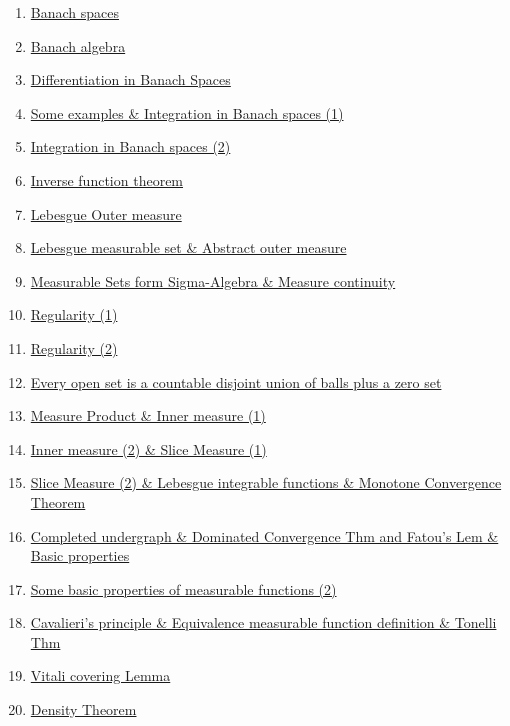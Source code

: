 \documentclass[11pt]{article}
\begin{document}
\begin{enumerate}
	\item	\href{https://mp.weixin.qq.com/s/TkN4d9Hla9-C_1o2VpvLXg}{Banach spaces} 	%
	\item 	\href{https://mp.weixin.qq.com/s/GF_PalPTEH7uFpzTMvFzXw}{Banach algebra}	%
	\item 	\href{https://mp.weixin.qq.com/s/bSUyP1ZBOypLaOCTX3abCA}{Differentiation in Banach Spaces}	%
	\item 	\href{https://mp.weixin.qq.com/s/4mhJzCdRBN11zi2Dy0SvuA}{Some examples \& Integration in Banach spaces (1)}	%
	\item 	\href{https://mp.weixin.qq.com/s/Lhk-fSknKiRoxcfiHYq86w}{Integration in Banach spaces (2)}	%
	\item 	\href{https://mp.weixin.qq.com/s/Z1-miHbarybT2ZR0NitX9A}{Inverse function theorem}	%
	\item 	\href{https://mp.weixin.qq.com/s/DoGy5Ua4i2c-z_vObYHO-Q}{Lebesgue Outer measure}	%
	\item 	\href{https://mp.weixin.qq.com/s/b8MljlQaD5a3mo872VB7-w}{Lebesgue measurable set \& Abstract outer measure}	%
	\item	\href{https://mp.weixin.qq.com/s/Dm26WpkdsaS4-kf88-pAqQ}{Measurable Sets form Sigma-Algebra \& Measure continuity}	%
	\item	\href{https://mp.weixin.qq.com/s/-v4McKbHcJa2a7K-7kjHPw}{Regularity (1)}	%
	\item	\href{https://mp.weixin.qq.com/s/sKGz15q_ODPhUum1d-5-ew}{Regularity (2)} 	%
	\item 	\href{https://mp.weixin.qq.com/s/QfF9wslg56szUqV5S9Ag4Q}{Every open set is a countable disjoint union of balls plus a zero set}	%
	\item 	\href{https://mp.weixin.qq.com/s/p7CfscjUPsxh4OCgwKjGiA}{Measure Product \& Inner measure (1)}	%
	\item 	\href{https://mp.weixin.qq.com/s/UdoUtutFqQ-akVsdmAttDg}{Inner measure (2) \& Slice Measure (1)}	%
	\item 	\href{https://mp.weixin.qq.com/s/2fK9z8rTUTzREvXB9ZUiVQ}{Slice Measure (2) \& Lebesgue integrable functions \& Monotone Convergence Theorem}	%
	\item 	\href{https://mp.weixin.qq.com/s/ZBjjosmm-aI13SFK3FD4dw}{Completed undergraph \& Dominated Convergence Thm and Fatou’s Lem \& Basic properties}	%
	\item 	\href{https://mp.weixin.qq.com/s/Bt4O4E_81nVkne1RfZ3FAA}{Some basic properties of measurable functions (2)}	%
	\item 	\href{https://mp.weixin.qq.com/s/OdtftvtTqB4Ix0UIsViFng}{Cavalieri's principle \& Equivalence measurable function definition \& Tonelli Thm}	%
	\item 	\href{https://mp.weixin.qq.com/s/hHAyKkd_I6ffiJXtQfVqGA}{Vitali covering Lemma}	%
	\item 	\href{https://mp.weixin.qq.com/s/RBM3zLLEe9C4Jrct7W5sOg}{Density Theorem}	%
\end{enumerate}
\end{document}
